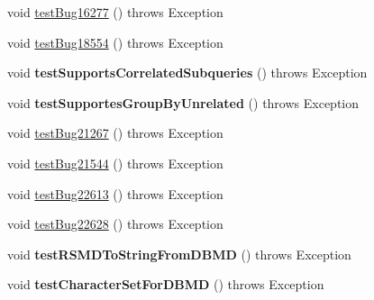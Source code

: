\begin{DoxyCompactItemize}
\item 
void \mbox{\hyperlink{classtestsuite_1_1regression_1_1_meta_data_regression_test_a7ddf69bf32cb524239b07b822585d44d}{test\+Bug16277}} ()  throws Exception 
\item 
void \mbox{\hyperlink{classtestsuite_1_1regression_1_1_meta_data_regression_test_ac00a7a14db2a9fd6e4c1439959c0a67d}{test\+Bug18554}} ()  throws Exception 
\item 
\mbox{\label{classtestsuite_1_1regression_1_1_meta_data_regression_test_a61c54cc997687666b3987a8c8e3d8647}} 
void {\bfseries test\+Supports\+Correlated\+Subqueries} ()  throws Exception 
\item 
\mbox{\label{classtestsuite_1_1regression_1_1_meta_data_regression_test_ac35d7a3f186c9873b8e3796368af92c6}} 
void {\bfseries test\+Supportes\+Group\+By\+Unrelated} ()  throws Exception 
\item 
void \mbox{\hyperlink{classtestsuite_1_1regression_1_1_meta_data_regression_test_a45d7aaa5c8653a65c36f2e40ee7b154a}{test\+Bug21267}} ()  throws Exception 
\item 
void \mbox{\hyperlink{classtestsuite_1_1regression_1_1_meta_data_regression_test_ad063a1590627c6505de6ff9a64d90ab8}{test\+Bug21544}} ()  throws Exception 
\item 
void \mbox{\hyperlink{classtestsuite_1_1regression_1_1_meta_data_regression_test_a5b7642788b0d18aad6874a2770cfdf5d}{test\+Bug22613}} ()  throws Exception 
\item 
void \mbox{\hyperlink{classtestsuite_1_1regression_1_1_meta_data_regression_test_a1a86a1e268439afcb06e201e8c7bd486}{test\+Bug22628}} ()  throws Exception 
\item 
\mbox{\label{classtestsuite_1_1regression_1_1_meta_data_regression_test_a50b58104e10eaa8f4be185c852cdf1ba}} 
void {\bfseries test\+R\+S\+M\+D\+To\+String\+From\+D\+B\+MD} ()  throws Exception 
\item 
\mbox{\label{classtestsuite_1_1regression_1_1_meta_data_regression_test_aff18615ce9761d601ce3bfbf73901c2a}} 
void {\bfseries test\+Character\+Set\+For\+D\+B\+MD} ()  throws Exception 
\item 

\end{DoxyCompactItemize}
